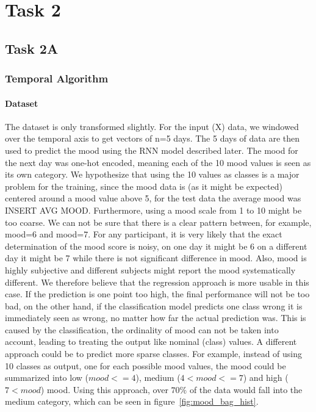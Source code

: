 \section{Task 2}
\subsection{Task 2A}

\subsubsection*{Temporal Algorithm}
\paragraph*{Dataset}
The dataset is only transformed slightly. For the input (X) data, we windowed over the temporal axis to get vectors
of n=5 days. The 5 days of data are then used to predict the mood using the RNN model described later. The mood for the
next day was one-hot encoded, meaning each of the 10 mood values is seen as its own category. We hypothesize that using the
10 values as classes is a major problem for the training, since the mood data is (as it might be expected) centered around
a mood value above 5, for the test data the average mood was INSERT AVG MOOD. Furthermore, using a mood scale from 1 to 10
might be too coarse. We can not be sure that there is a clear pattern between, for example, mood=6 and mood=7. For any participant,
it is very likely that the exact determination of the mood score is noisy, on one day it might be 6 on a different day it
might be 7 while there is not significant difference in mood. Also, mood is highly subjective and different subjects might
report the mood systematically different. We therefore believe that the regression approach is more usable in this
case. If the prediction is one point too high, the final performance will not be too bad, on the other hand, if the classification
model predicts one class wrong it is immediately seen as wrong, no matter how far the actual prediction was. This is caused by
the classification, the ordinality of mood can not be taken into account, leading to treating the output like nominal (class) values.
A different approach could be to predict more sparse classes. For example, instead of using 10 classes as output, one for each
possible mood values, the mood could be summarized into low ($mood<=4$), medium ($4<mood<=7$) and high ($7<mood$) mood.
Using this approach, over $70\%$ of the data would fall into the medium category, which can be seen in figure~\ref{fig:mood_bag_hist}.
